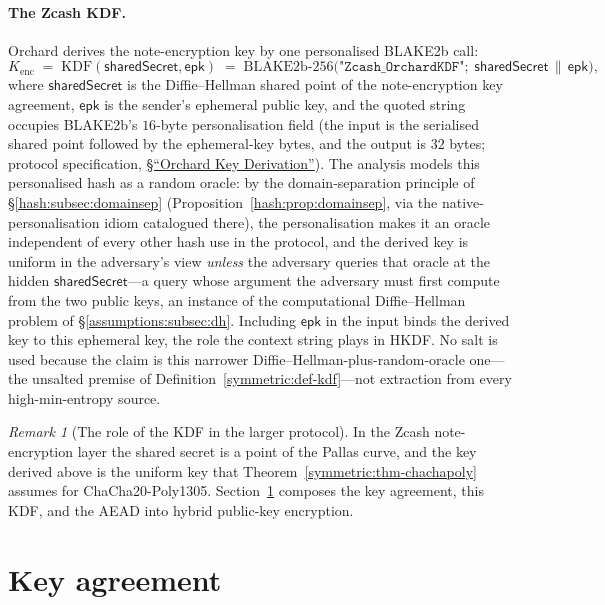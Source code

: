 \documentclass[11pt,a4paper]{article}
\theoremstyle{definition}
\theoremstyle{remark}
\newtheorem{remark}[theorem]{Remark}
\begin{document}
\paragraph{The Zcash KDF.}
Orchard derives the note-encryption key by one personalised BLAKE2b
call:
\[
K_{\mathrm{enc}}
\;=\; \mathrm{KDF}(\mathsf{sharedSecret}, \mathsf{epk})
\;=\; \mathrm{BLAKE2b}\text{-}256\bigl(
  \texttt{"Zcash\_OrchardKDF"};\;
  \mathsf{sharedSecret} \,\|\, \mathsf{epk}
\bigr),
\]
where \(\mathsf{sharedSecret}\) is the Diffie--Hellman shared point
of the note-encryption key agreement,
\(\mathsf{epk}\) is the sender's ephemeral public key, and the quoted
string occupies BLAKE2b's \(16\)-byte personalisation field
(the input is the serialised shared point followed by the
ephemeral-key bytes, and the output is \(32\) bytes;
protocol specification,
\href{https://zips.z.cash/protocol/protocol.pdf\#concreteorchardkdf}{\S``Orchard Key Derivation''}). The
analysis models this personalised hash as a random oracle: by the
domain-separation principle of \S\ref{hash:subsec:domainsep}
(Proposition~\ref{hash:prop:domainsep}, via the native-personalisation
idiom catalogued there), the personalisation makes it an oracle
independent of every other hash use in the protocol, and the derived
key is uniform in the adversary's view \emph{unless} the adversary
queries that oracle at the hidden \(\mathsf{sharedSecret}\)---a query
whose argument the adversary must first compute from the two public
keys, an instance of the computational Diffie--Hellman problem of
\S\ref{assumptions:subsec:dh}. Including \(\mathsf{epk}\) in the
input binds the derived key to this ephemeral key, the role the
context string plays in \textsf{HKDF}. No salt is used because the
claim is this narrower Diffie--Hellman-plus-random-oracle one---the
unsalted premise of Definition~\ref{symmetric:def-kdf}---not
extraction from every high-min-entropy source.

\begin{remark}[The role of the KDF in the larger protocol]
\label{symmetric:rem-kdf-role}
In the Zcash note-encryption layer the shared secret is a point of the
Pallas curve, and the key derived above is the uniform key that
Theorem~\ref{symmetric:thm-chachapoly} assumes for
\textsf{ChaCha20-Poly1305}. Section~\ref{sec:keyagreement} composes
the key agreement, this KDF, and the AEAD into hybrid public-key
encryption.
\end{remark}

\section{Key agreement}\label{sec:keyagreement}
\end{document}
